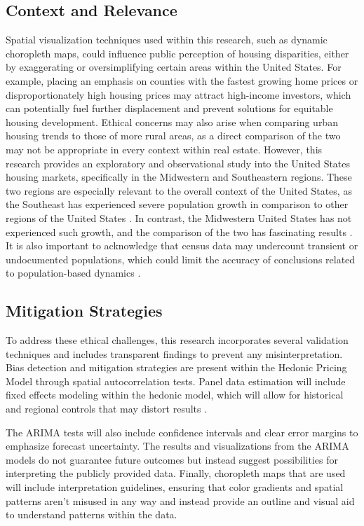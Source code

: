 \documentclass[journal,article,submit,pdftex,moreauthors]{Definitions/mdpi}
\begin{document}
\subsection{Context and Relevance}

Spatial visualization techniques used within this research, such as dynamic choropleth maps, could influence public perception of housing disparities, either by exaggerating or oversimplifying certain areas within the United States. For example, placing an emphasis on counties with the fastest growing home prices or disproportionately high housing prices may attract high-income investors, which can potentially fuel further displacement and prevent solutions for equitable housing development. Ethical concerns may also arise when comparing urban housing trends to those of more rural areas, as a direct comparison of the two may not be appropriate in every context within real estate. However, this research provides an exploratory and observational study into the United States housing markets, specifically in the Midwestern and Southeastern regions. These two regions are especially relevant to the overall context of the United States, as the Southeast has experienced severe population growth in comparison to other regions of the United States \citep{biernackalievestro_2023_southern}. In contrast, the Midwestern United States has not experienced such growth, and the comparison of the two has fascinating results \citep{maynard_2021_population}. It is also important to acknowledge that census data may undercount transient or undocumented populations, which could limit the accuracy of conclusions related to population-based dynamics \citep{cooper_2020_on}.

\subsection{Mitigation Strategies}

To address these ethical challenges, this research incorporates several validation techniques and includes transparent findings to prevent any misinterpretation. Bias detection and mitigation strategies are present within the Hedonic Pricing Model through spatial autocorrelation tests. Panel data estimation will include fixed effects modeling within the hedonic model, which will allow for historical and regional controls that may distort results \citep{torresreyna_2010_getting}. 

The ARIMA tests will also include confidence intervals and clear error margins to emphasize forecast uncertainty. The results and visualizations from the ARIMA models do not guarantee future outcomes but instead suggest possibilities for interpreting the publicly provided data. Finally, choropleth maps that are used will include interpretation guidelines, ensuring that color gradients and spatial patterns aren’t misused in any way and instead provide an outline and visual aid to understand patterns within the data.
\end{document}
